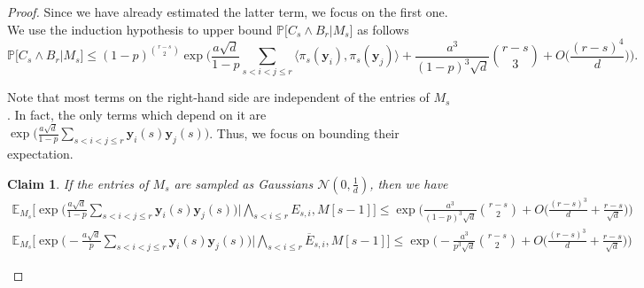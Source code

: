 \documentclass[10pt,a4paper]{amsart}
\newtheorem{claim}{Claim}
\def\Pb{\mathbb{P}}
\def\bE{\mathbb{E}}
\def\by{\boldsymbol{y}}
\def\cN{\mathcal{N}}
\begin{document}
\begin{proof}
Since we have already estimated the latter term, we focus on the first one. We use the induction hypothesis to upper bound $\Pb\Big[C_{s}\wedge B_r\Big| M_{s}\Big]$ as follows
{\smaller[0.3]
\begin{equation}\label{eq:induction_hypothesis_blue}
    \Pb\Big[C_{s}\wedge B_r\Big| M_{s}\Big]\leq (1\!-\!p)^{\binom{r-s}{2}}\exp\bigg(\frac{a\sqrt{d}}{1\!-\!p}\!\!\sum_{s<i< j\leq r}\!\!\!\!\langle \pi_s(\by_i), \pi_s(\by_j)\rangle + \frac{a^3}{(1\!-\!p)^3\sqrt{d}}\binom{r\!-\!s}{3}\!+\!O\Big(\frac{(r\!-\!s)^4}{d}\Big)\bigg).
\end{equation}
}

Note that most terms on the right-hand side are independent of the entries of $M_s$. In fact, the only terms which depend on it are $\exp\Big(\frac{a\sqrt{d}}{1-p}\sum_{s<i<j\leq r} \by_i(s)\by_j(s)\Big)$. Thus, we focus on bounding their expectation.

\begin{claim}\label{claim:auxiliary_2}
If the entries of $M_s$ are sampled as Gaussians $\cN(0, \frac{1}{d})$, then we have
{\smaller[0.3]
\begin{align}
    \bE_{M_s}\bigg[\exp\bigg(\frac{a\sqrt{d}}{1\!-\!p}\!\!\sum_{s<i<j\leq r}\!\! \by_i(s)\by_j(s)\bigg)\bigg| \bigwedge_{s<i\leq r}\!\! E_{s, i}, M[s\!-\!1]\bigg]\leq  \exp\bigg(\frac{a^3}{(1\!-\!p)^3\sqrt{d}}\binom{r\!-\!s}{2}\!+\!O\Big(\frac{(r\!-\!s)^3}{d}\!+\!\frac{r-s}{\sqrt{d}}\Big)\bigg)\label{eq:auxiliary_2_blue}    \\
    \bE_{M_s}\bigg[\exp\bigg(\!-\!\frac{a\sqrt{d}}{p}\!\!\sum_{s<i<j\leq r}\!\! \by_i(s)\by_j(s)\bigg)\bigg| \bigwedge_{s<i\leq r}\!\! \overline{E}_{s, i}, M[s\!-\!1]\bigg]\leq \exp\bigg(\!-\!\frac{a^3}{p^3\sqrt{d}}\binom{r\!-\!s}{2}\!+\!O\Big(\frac{(r\!-\!s)^3}{d}\!+\!\frac{r-s}{\sqrt{d}}\Big)\bigg)\label{eq:auxiliary_2_red}
\end{align}
}
\end{claim}


\end{proof}
\end{document}

